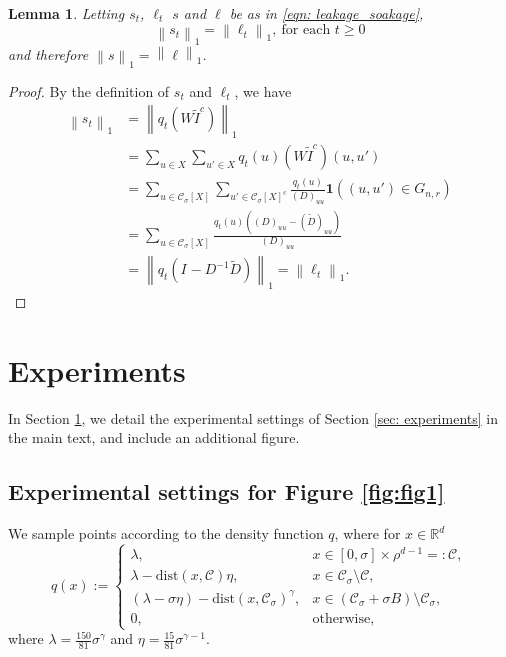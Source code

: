 \documentclass[11pt,twoside]{article}
\newtheorem{lemma}{Lemma}
\newcommand{\Reals}{\mathbb{R}}
\newcommand{\Rd}{\Reals^d}
\newcommand{\norm}[1]{\left\lVert#1\right\rVert}
\newcommand{\1}{\mathbf{1}}
\newcommand{\dist}{\mathrm{dist}}
\newcommand{\Xbf}{X}             %
\newcommand{\Wbf}{W}
\newcommand{\Dbf}{D}
\newcommand{\Ibf}[1]{I_{#1}}
\newcommand{\Cset}{\mathcal{C}}
\newcommand{\Csig}{\Cset_{\sigma}}
\begin{document}
\begin{lemma}
	\label{lem: total_leakage_equal_total_soakage}
	Letting $s_t$, $\ell_t$ $s$ and $\ell$ be as in \eqref{eqn: leakage_soakage},
	\begin{equation*}
	\norm{s_t}_1 = \norm{\ell_t}_1,~ \textrm{for each $t \geq 0$}
	\end{equation*}
	and therefore $\norm{s}_1 = \norm{\ell}_1$. 
\end{lemma}
\begin{proof}
	By the definition of $s_t$ and $\ell_t$, we have
	\begin{align*}
	\norm{s_t}_1 & = \norm{q_t (\Wbf \widetilde{I}^c)}_1 \\
	& = \sum_{u \in \Xbf} \sum_{u' \in \Xbf} q_t(u) (\Wbf \widetilde{I}^c)(u, u') \\
	& = \sum_{u \in\Csig[\Xbf]} \sum_{u' \in \Csig[\Xbf]^c} \frac{q_t(u)}{(\Dbf)_{uu}} \1((u,u') \in G_{n,r}) \\
	& = \sum_{u \in \Csig[\Xbf]} \frac{q_t(u) \left((\Dbf)_{uu} - (\widetilde{\Dbf})_{uu} \right)}{(\Dbf)_{uu}} \\
	& = \norm{q_t (\Ibf{} - \Dbf^{-1} \widetilde{\Dbf})}_1 = \norm{\ell_t}_1.
	\end{align*}
\end{proof}

\section{Experiments}
\label{sec: experimental_setting}

In Section \ref{sec: experimental_setting}, we detail the experimental settings of Section \ref{sec: experiments} in the main text, and include an additional figure. 

\subsection{Experimental settings for Figure \ref{fig:fig1}}
We sample points according to the density function $q$, where for $x \in \Rd$
\begin{equation}
q(x) :=
\begin{cases}
\lambda,~ & x \in [0,\sigma] \times \rho^{d-1} =: \Cset, \\
\lambda - \dist(x,\Cset)\eta,~ & x \in \Csig \setminus \Cset, \\
(\lambda - \sigma \eta) - \dist(x,\Csig)^{\gamma}, & x \in (\Csig + \sigma B) \setminus \Csig, \\
0,~ & \textrm{otherwise},
\end{cases}
\end{equation}
where $\lambda = \frac{150}{81} \sigma^{\gamma}$ and $\eta = \frac{15}{81} \sigma^{\gamma - 1}$.
\end{document}
